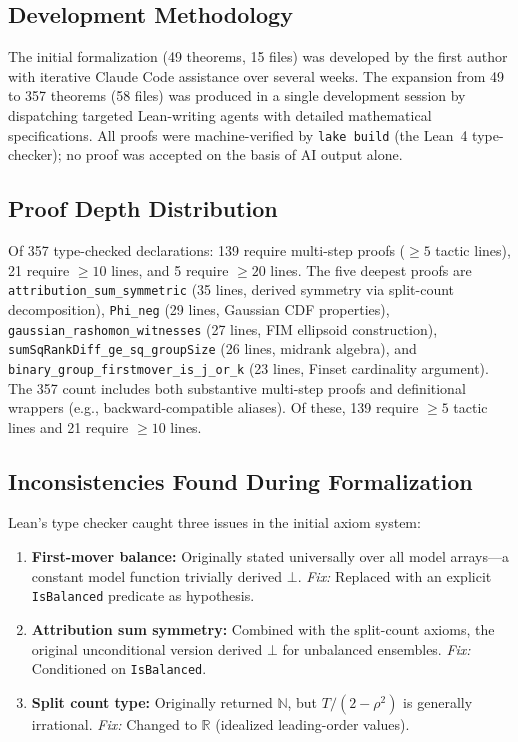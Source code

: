 \documentclass{article}
\begin{document}
\subsection{Development Methodology}

The initial formalization (49 theorems, 15 files) was developed by the first author with iterative Claude Code assistance over several weeks. The expansion from 49 to 357 theorems (58 files) was produced in a single development session by dispatching targeted Lean-writing agents with detailed mathematical specifications. All proofs were machine-verified by \texttt{lake build} (the Lean~4 type-checker); no proof was accepted on the basis of AI output alone.

\subsection{Proof Depth Distribution}

Of 357 type-checked declarations: 139 require multi-step proofs (${\geq}5$ tactic lines), 21 require ${\geq}10$ lines, and 5 require ${\geq}20$ lines. The five deepest proofs are \texttt{attribution\_sum\_symmetric} (35 lines, derived symmetry via split-count decomposition), \texttt{Phi\_neg} (29 lines, Gaussian CDF properties), \texttt{gaussian\_rashomon\_witnesses} (27 lines, FIM ellipsoid construction), \texttt{sumSqRankDiff\_ge\_sq\_groupSize} (26 lines, midrank algebra), and \texttt{binary\_group\_firstmover\_is\_j\_or\_k} (23 lines, Finset cardinality argument).
The 357 count includes both substantive multi-step proofs and definitional wrappers (e.g., backward-compatible aliases). Of these, 139 require ${\geq}5$ tactic lines and 21 require ${\geq}10$ lines.

\subsection{Inconsistencies Found During Formalization}

Lean's type checker caught three issues in the initial axiom system:

\begin{enumerate}
\item \textbf{First-mover balance:} Originally stated universally over all model arrays---a constant model function trivially derived $\bot$. \emph{Fix:} Replaced with an explicit \texttt{IsBalanced} predicate as hypothesis.

\item \textbf{Attribution sum symmetry:} Combined with the split-count axioms, the original unconditional version derived $\bot$ for unbalanced ensembles. \emph{Fix:} Conditioned on \texttt{IsBalanced}.

\item \textbf{Split count type:} Originally returned $\mathbb{N}$, but $T/(2-\rho^2)$ is generally irrational. \emph{Fix:} Changed to $\mathbb{R}$ (idealized leading-order values).
\end{enumerate}
\end{document}
